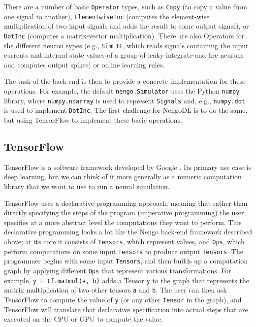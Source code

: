 \documentclass{article}
\begin{document}
There are a number of basic \texttt{Operator} types, such as \texttt{Copy} (to copy a value from one signal to another), \texttt{ElementwiseInc} (computes the element-wise multiplication of two input signals and adds the result to some output signal), or \texttt{DotInc} (computes a matrix-vector multiplication).  There are also Operators for the different neuron types (e.g., \texttt{SimLIF}, which reads signals containing the input currents and internal state values of a group of leaky-integrate-and-fire neurons and computes output spikes) or online learning rules.

The task of the back-end is then to provide a concrete implementation for these operations.  For example, the default \texttt{nengo.Simulator} uses the Python \texttt{numpy} library, where \texttt{numpy.ndarray} is used to represent \texttt{Signals} and, e.g., \texttt{numpy.dot} is used to implement \texttt{DotInc}.  The first challenge for NengoDL is to do the same, but using TensorFlow to implement these basic operations.

\subsection{TensorFlow}

TensorFlow is a software framework developed by Google \citep{Abadi2016}.  Its primary use case is deep learning, but we can think of it more generally as a numeric computation library that we want to use to run a neural simulation.

TensorFlow uses a declarative programming approach, meaning that rather than directly specifying the steps of the program (imperative programming) the user specifies at a more abstract level the computations they want to perform.  This declarative programming looks a lot like the Nengo back-end framework described above; at its core it consists of \texttt{Tensors}, which represent values, and \texttt{Ops}, which perform computations on some input \texttt{Tensors} to produce output \texttt{Tensors}. The programmer begins with some input \texttt{Tensors}, and then builds up a computation graph by applying different \texttt{Ops} that represent various transformations.  For example, \texttt{y = tf.matmul(a, b)} adds a Tensor \texttt{y} to the graph that represents the matrix multiplication of two other tensors \texttt{a} and \texttt{b}.  The user can then ask TensorFlow to compute the value of \texttt{y} (or any other \texttt{Tensor} in the graph), and TensorFlow will translate that declarative specification into actual steps that are executed on the CPU or GPU to compute the value.
\end{document}
